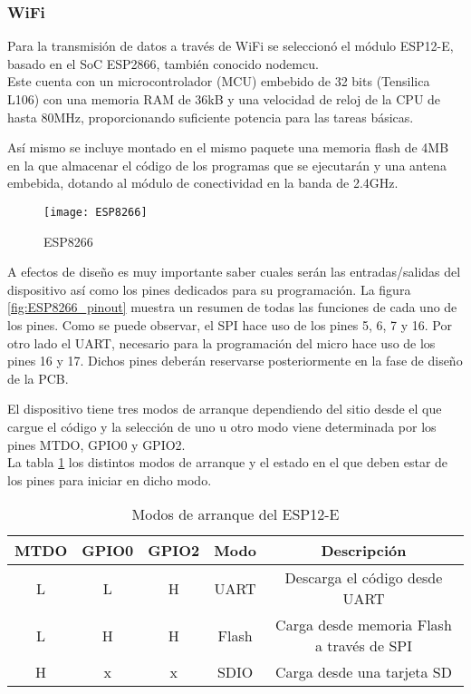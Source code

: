 \subsubsection{WiFi\label{sec:WiFi_N}}

Para la transmisión de datos a través de WiFi se seleccionó el módulo ESP12-E, basado en el \acrshort{SoC} ESP2866, también conocido nodemcu.
\\Este cuenta con un microcontrolador (\acrshort{MCU}) embebido de 32 bits (Tensilica L106) con una memoria \acrshort{RAM} de 36kB y una velocidad de reloj de la \acrshort{CPU} de hasta 80MHz, proporcionando suficiente potencia para las tareas básicas.

Así mismo se incluye montado en el mismo paquete una memoria flash de 4MB en la que almacenar el código de los programas que se ejecutarán y una antena embebida, dotando al módulo de conectividad en la banda de 2.4GHz.

\begin{figure} [h]
    \centering
    \texttt{[image: ESP8266]}
    \caption{ESP8266}
    \label{fig:ESP8266}
\end{figure}

A efectos de diseño es muy importante saber cuales serán las entradas/salidas del dispositivo así como los pines dedicados para su programación. La figura \ref{fig:ESP8266_pinout} muestra un resumen de todas las funciones de cada uno de los pines. Como se puede observar, el \acrshort{SPI} hace uso de los pines 5, 6, 7 y 16. Por otro lado el \acrshort{UART}, necesario para la programación del micro hace uso de los pines 16 y 17. Dichos pines deberán reservarse posteriormente en la fase de diseño de la \acrshort{PCB}.

El dispositivo tiene tres modos de arranque dependiendo del sitio desde el que cargue el código y la selección de uno u otro modo viene determinada por los pines MTDO, GPIO0 y GPIO2. \\La tabla \ref{tab:ESP_Boot_Modes} los distintos modos de arranque y el estado en el que deben estar de los pines para iniciar en dicho modo.
\begin{table} [h]
 	\centering
	\begin{tabular}{|c|c|c|c|c|}
		\hline 
		MTDO & GPIO0 & GPIO2 & Modo & Descripción \\ 
		\hline 
		L & L & H & UART & Descarga el código desde UART \\ 
		\hline 
		L & H & H & Flash & Carga desde memoria Flash a través de SPI \\ 
		\hline 
		H & x & x & SDIO & Carga desde una tarjeta SD \\ 
		\hline 
	\end{tabular} 
	\caption{Modos de arranque del ESP12-E \cite{ESP_Boot_mode}}
    \label{tab:ESP_Boot_Modes}
\end{table}	

